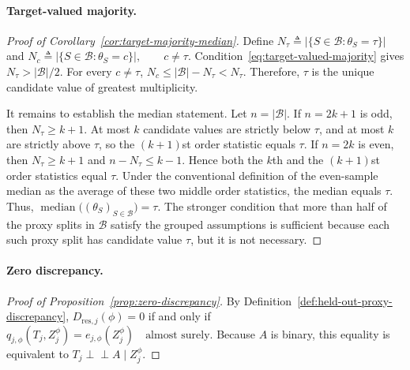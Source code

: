 \paragraph{Target-valued majority.}
\begin{proof}[Proof of Corollary~\ref{cor:target-majority-median}]
Define
\(N_\tau \triangleq \bigl|\{S\in\mathcal B:\theta_S=\tau\}\bigr|\) and \(N_c \triangleq \bigl|\{S\in\mathcal B:\theta_S=c\}\bigr|, \qquad c\ne\tau.\)
Condition~\eqref{eq:target-valued-majority} gives $N_\tau>|\mathcal B|/2$. For every $c\ne\tau$,
\(N_c \le |\mathcal B|-N_\tau < N_\tau.\)
Therefore, $\tau$ is the unique candidate value of greatest multiplicity.

It remains to establish the median statement. Let $n=|\mathcal B|$. If $n=2k+1$ is odd, then $N_\tau\ge k+1$. At most $k$ candidate values are strictly below $\tau$, and at most $k$ are strictly above $\tau$, so the $(k+1)$st order statistic equals $\tau$. If $n=2k$ is even, then $N_\tau\ge k+1$ and $n-N_\tau\le k-1$. Hence both the $k$th and the $(k+1)$st order statistics equal $\tau$. Under the conventional definition of the even-sample median as the average of these two middle order statistics, the median equals $\tau$. Thus,
\(\operatorname{median}\bigl((\theta_S)_{S\in\mathcal B}\bigr)=\tau.\)
The stronger condition that more than half of the proxy splits in $\mathcal B$ satisfy the grouped assumptions is sufficient because each such proxy split has candidate value $\tau$, but it is not necessary.
\end{proof}

\paragraph{Zero discrepancy.}
\begin{proof}[Proof of Proposition~\ref{prop:zero-discrepancy}]
By Definition~\ref{def:held-out-proxy-discrepancy}, $D_{\mathrm{res},j}(\phi)=0$ if and only if
\(q_{j,\phi}(T_j,Z_j^\phi)=e_{j,\phi}(Z_j^\phi) \quad\text{almost surely}.\)
Because $A$ is binary, this equality is equivalent to $T_j\perp\!\!\!\perp A\mid Z_j^\phi$.
\end{proof}

